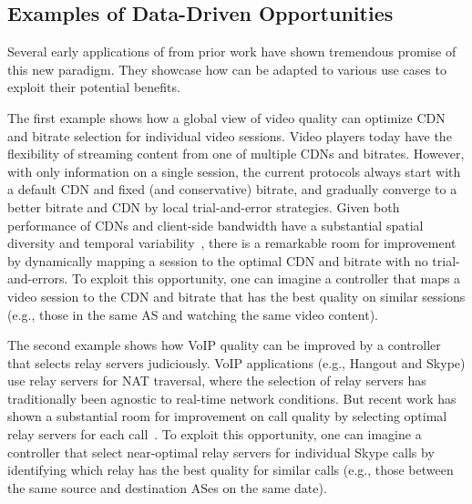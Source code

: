\subsection{Examples of Data-Driven Opportunities}
\label{subsec:overview:examples}

Several early applications of \ddn from prior work have shown 
tremendous promise of this new paradigm.
They showcase how \ddn can be adapted to various use cases 
to exploit their potential benefits. %

The first example shows how a global view of video quality 
can optimize CDN and bitrate selection for individual video 
sessions. 
Video players today have the flexibility of streaming content 
from one of multiple CDNs and bitrates. However, with
only information on a single session, the current protocols 
always start with a default CDN and fixed (and conservative) 
bitrate, and gradually converge to a better bitrate and 
CDN by local trial-and-error strategies.
Given both performance of CDNs and client-side bandwidth 
have a substantial spatial diversity
  and temporal variability~\cite{sigcomm12conviva}, there is a
remarkable room for improvement by dynamically mapping a 
session to the optimal CDN and bitrate with no trial-and-errors.
To exploit this opportunity, one can imagine a \ddn controller
that maps a video session  to the CDN and bitrate that has 
the best quality on similar sessions (e.g.,
those in the same AS and watching the same video content).


The second example shows how VoIP quality can be improved by 
a \ddn controller that selects relay servers judiciously.
VoIP applications (e.g., Hangout and Skype) use relay servers 
for NAT traversal, where the selection of relay servers 
has traditionally been agnostic to real-time network conditions. 
But recent work has shown a
substantial room for improvement on call quality by selecting 
optimal relay servers for each
call~\cite{rewan-hotnets2015}. 
To exploit this opportunity, one can imagine a \ddn controller
that select near-optimal relay servers for individual Skype calls 
by identifying which relay has the best quality for similar calls 
(e.g., those between the same source and destination ASes 
on the same date).


